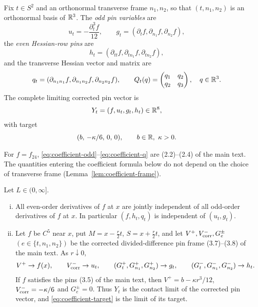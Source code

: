 \begin{definition}\label{def:coefficient-frame}
Fix $t\in S^2$ and an orthonormal transverse frame $n_1,n_2$, so that $(t,n_1,n_2)$ is an orthonormal basis of $\mathbb R^3$. The \emph{odd pin variables} are
\begin{equation}\label{eq:coefficient-odd}
u_t=-\frac{\partial_t^3f}{12},\qquad g_t=(\partial_tf,\partial_{n_1}f,\partial_{n_2}f),
\end{equation}
the \emph{even Hessian-row pins} are
\begin{equation}\label{eq:coefficient-h}
h_t=(\partial_{tt}f,\partial_{tn_1}f,\partial_{tn_2}f),
\end{equation}
and the transverse Hessian vector and matrix are
\begin{equation}\label{eq:coefficient-q}
q_t=(\partial_{n_1n_1}f,\partial_{n_1n_2}f,\partial_{n_2n_2}f),\qquad
Q_t(q)=\begin{pmatrix}q_1&q_2\\ q_2&q_3\end{pmatrix},\quad q\in\mathbb R^3 .
\end{equation}
The complete limiting corrected pin vector is
\begin{equation}\label{eq:coefficient-Y}
Y_t=(f,u_t,g_t,h_t)\in\mathbb R^8,
\end{equation}
with target
\begin{equation}\label{eq:coefficient-target}
(b,\,-\kappa/6,\,0,\,0),\qquad b\in\mathbb R,\ \kappa>0 .
\end{equation}
\end{definition}

For $f=f_{24}$, \eqref{eq:coefficient-odd}--\eqref{eq:coefficient-q} are (2.2)--(2.4) of the main text. The quantities entering the coefficient formula below do not depend on the choice of transverse frame (Lemma~\ref{lem:coefficient-frame}).

\begin{lemma}\label{lem:coefficient-parity}
Let $L\in(0,\infty]$.
\begin{enumerate}[(i)]
\item All even-order derivatives of $f$ at $x$ are jointly independent of all odd-order derivatives of $f$ at $x$. In particular $(f,h_t,q_t)$ is independent of $(u_t,g_t)$.
\item Let $f$ be $C^5$ near $x$, put $M=x-\frac r2t$, $S=x+\frac r2t$, and let $V^+,V^-_{\rm corr},G^\pm_e$ $(e\in\{t,n_1,n_2\})$ be the corrected divided-difference pin frame (3.7)--(3.8) of the main text. As $r\downarrow0$,
\[
V^+\to f(x),\qquad V^-_{\rm corr}\to u_t,\qquad (G^+_t,G^+_{n_1},G^+_{n_2})\to g_t,\qquad (G^-_t,G^-_{n_1},G^-_{n_2})\to h_t .
\]
If $f$ satisfies the pins (3.5) of the main text, then $V^+=b-\kappa r^3/12$, $V^-_{\rm corr}=-\kappa/6$ and $G^\pm_e=0$. Thus $Y_t$ is the contact limit of the corrected pin vector, and \eqref{eq:coefficient-target} is the limit of its target.
\end{enumerate}
\end{lemma}

